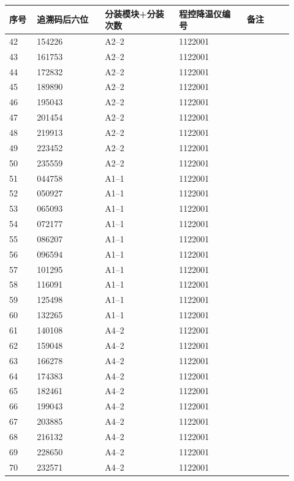 \documentclass[UTF8,10pt,a4paper,fontset=fandol]{ctexart}
\begin{document}
\begin{center}
\begin{tabular}{|p{0.09\linewidth}|p{0.22\linewidth}|p{0.24\linewidth}|p{0.22\linewidth}|p{0.15\linewidth}|}
\hline
序号 & 追溯码后六位 & 分装模块+分装次数 & 程控降温仪编号 & 备注 \\ \hline
42 & 154226 & A2--2 & 1122001 & \\ \hline
43 & 161753 & A2--2 & 1122001 & \\ \hline
44 & 172832 & A2--2 & 1122001 & \\ \hline
45 & 189890 & A2--2 & 1122001 & \\ \hline
46 & 195043 & A2--2 & 1122001 & \\ \hline
47 & 201454 & A2--2 & 1122001 & \\ \hline
48 & 219913 & A2--2 & 1122001 & \\ \hline
49 & 223452 & A2--2 & 1122001 & \\ \hline
50 & 235559 & A2--2 & 1122001 & \\ \hline
51 & 044758 & A1--1 & 1122001 & \\ \hline
52 & 050927 & A1--1 & 1122001 & \\ \hline
53 & 065093 & A1--1 & 1122001 & \\ \hline
54 & 072177 & A1--1 & 1122001 & \\ \hline
55 & 086207 & A1--1 & 1122001 & \\ \hline
56 & 096594 & A1--1 & 1122001 & \\ \hline
57 & 101295 & A1--1 & 1122001 & \\ \hline
58 & 116091 & A1--1 & 1122001 & \\ \hline
59 & 125498 & A1--1 & 1122001 &
\\ \hline
60 & 132265 & A1--1 & 1122001 & \\ \hline
61 & 140108 & A4--2 & 1122001 & \\ \hline
62 & 159048 & A4--2 & 1122001 & \\ \hline
63 & 166278 & A4--2 & 1122001 & \\ \hline
64 & 174383 & A4--2 & 1122001 & \\ \hline
65 & 182461 & A4--2 & 1122001 & \\ \hline
66 & 199043 & A4--2 & 1122001 & \\ \hline
67 & 203885 & A4--2 & 1122001 & \\ \hline
68 & 216132 & A4--2 & 1122001 & \\ \hline
69 & 228650 & A4--2 & 1122001 & \\ \hline
70 & 232571 & A4--2 & 1122001 & \\ \hline

\end{tabular}
\end{center}
\end{document}
